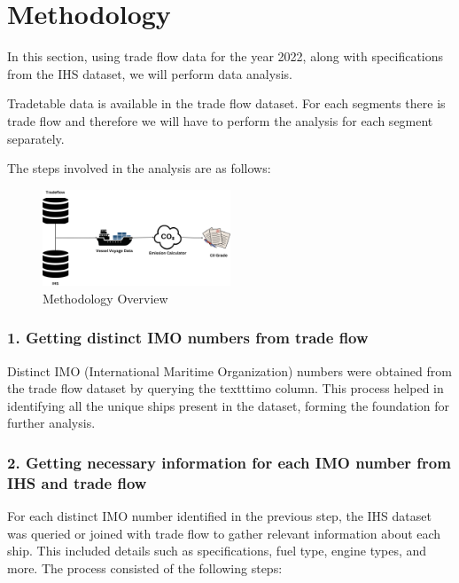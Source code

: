\section{Methodology}


In this section, using trade flow data for the year 2022, along with specifications from the IHS dataset, we will perform data analysis.

Tradetable data is available in the trade flow dataset. For each segments there is trade flow and therefore we will have to perform the analysis for each segment separately.

The steps involved in the analysis are as follows:

\begin{figure}[h]
    \centering
    \includegraphics[width=0.5\textwidth]{images/methodlogy.png}
    \caption{Methodology Overview}
    \label{methodlogy}
\end{figure}

\newpage

\subsubsection{1. Getting distinct IMO numbers from trade flow}

Distinct IMO (International Maritime Organization) numbers were obtained from the trade flow dataset by querying the texttt{imo} column. 
This process helped in identifying all the unique ships present in the dataset, forming the foundation for further analysis.


\subsubsection{2. Getting necessary information for each IMO number from IHS and trade flow}

For each distinct IMO number identified in the previous step, the IHS dataset was queried or joined with trade flow to gather relevant information about each ship. 
This included details such as specifications, fuel type, engine types, and more. 
The process consisted of the following steps:

